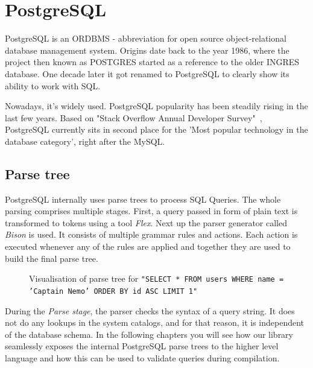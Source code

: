 \section{PostgreSQL}
PostgreSQL is an ORDBMS - abbreviation for open source object-relational database management system. Origins date back to the year 1986, where the project then known as POSTGRES started as a reference to the older INGRES database. One decade later it got renamed to PostgreSQL to clearly show its ability to work with SQL.\cite{PostgreSQL} 

Nowadays, it's widely used. PostgreSQL popularity has been steadily rising in the last few years. Based on "Stack Overflow Annual Developer Survey"~\cite{Stackoverflow survey}, PostgreSQL currently sits in second place for the 'Most popular technology in the database category', right after the MySQL.

\subsection{Parse tree}
PostgreSQL internally uses parse trees to process SQL Queries. The whole parsing comprises multiple stages. First, a query passed in form of plain text is transformed to tokens using a tool \textit{Flex}. Next up the parser generator called \textit{Bison} is used. It consists of multiple grammar rules and actions. Each action is executed whenever any of the rules are applied and together they are used to build the final parse tree.

\newpage

\begin{figure}[h]
  \caption {Visualisation of parse tree for \texttt{"SELECT * FROM users WHERE name = 'Captain Nemo' ORDER BY id ASC LIMIT 1"}\cite{Parse tree image}}
\end{figure}

During the \textit{Parse stage}, the parser checks the syntax of a query string. It does not do any lookups in the system catalogs, and for that reason, it is independent of the database schema. In the following chapters you will see how our library seamlessly exposes the internal PostgreSQL parse trees to the higher level language and how this can be used to validate queries during compilation.

